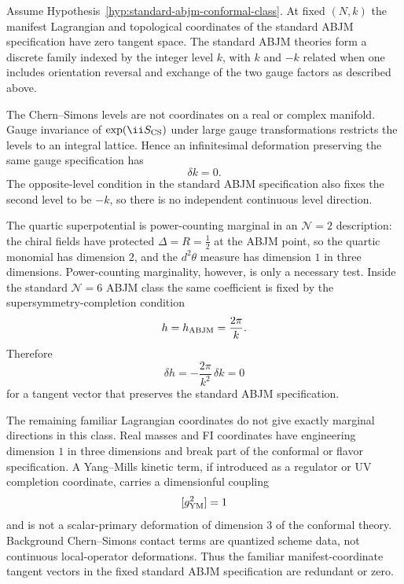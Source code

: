 \begin{remark}
\label{rem:standard-abjm-zero-dimensional-conformal-locus}
Assume Hypothesis~\ref{hyp:standard-abjm-conformal-class}.  At fixed
\((N,k)\) the manifest Lagrangian and topological coordinates of the standard
ABJM specification have zero tangent space.  The standard ABJM theories form a
discrete family indexed by the integer level \(k\), with \(k\) and \(-k\)
related when one includes orientation reversal and exchange of the two gauge
factors as described above.

The Chern--Simons levels are not coordinates on a real or complex manifold.
Gauge invariance of \(\exp(\ii S_{\rm CS})\) under large gauge
transformations restricts the levels to an integral lattice.  Hence an
infinitesimal deformation preserving the same gauge specification has
\[
  \delta k=0 .
\]
The opposite-level condition in the standard ABJM specification also fixes the
second level to be \(-k\), so there is no independent continuous level
direction.

The quartic superpotential is power-counting marginal in an
\(\mathcal N=2\) description: the chiral fields have protected
\(\Delta=R=\frac12\) at the ABJM point, so the quartic monomial has
dimension \(2\), and the \(d^2\theta\) measure has dimension \(1\) in three
dimensions.  Power-counting marginality, however, is only a necessary test.
Inside the standard \(\mathcal N=6\) ABJM class the same coefficient is
fixed by the supersymmetry-completion condition
\[
  h=h_{\rm ABJM}=\frac{2\pi}{k}.
\]
Therefore
\[
  \delta h=-\frac{2\pi}{k^2}\,\delta k=0
\]
for a tangent vector that preserves the standard ABJM specification.

The remaining familiar Lagrangian coordinates do not give exactly marginal
directions in this class.  Real masses and FI coordinates have engineering
dimension \(1\) in three dimensions and break part of the conformal or flavor
specification.  A Yang--Mills kinetic term, if introduced as a regulator or UV
completion coordinate, carries a dimensionful coupling
\[
  [g_{\rm YM}^2]=1
\]
and is not a scalar-primary deformation of dimension \(3\) of the conformal
theory.  Background Chern--Simons contact terms are quantized scheme data,
not continuous local-operator deformations.  Thus the familiar
manifest-coordinate tangent vectors in the fixed standard ABJM specification
are redundant or zero.
\end{remark}

